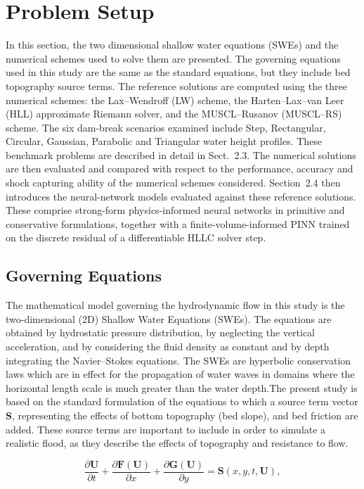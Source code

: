 \documentclass[12pt]{article}
\newcommand{\new}[1]{{\color{red}#1}}
\begin{document}
\section{Problem Setup}

In this section, the two dimensional shallow water equations (SWEs) and the numerical schemes used to solve them are presented. The governing equations used in this study are the same as the standard equations, but they include bed topography source terms. The reference solutions are computed using the three numerical schemes: the Lax–Wendroff (LW) scheme, the Harten–Lax–van Leer (HLL) approximate Riemann solver, and the MUSCL--Rusanov (MUSCL--RS) scheme. The six dam-break scenarios examined include Step, Rectangular, Circular, Gaussian, Parabolic and Triangular water height profiles. These benchmark problems are described in detail in Sect.~2.3. The numerical solutions are then evaluated and compared with respect to the performance, accuracy and shock capturing ability of the numerical schemes considered. \new{Section~2.4 then introduces the neural-network models evaluated against these reference solutions. These comprise strong-form physics-informed neural networks in primitive and conservative formulations, together with a finite-volume-informed PINN trained on the discrete residual of a differentiable HLLC solver step.}

\subsection{Governing Equations}
The mathematical model governing the hydrodynamic flow in this study is the two-dimensional (2D) Shallow Water Equations (SWEs). The equations are obtained by hydrostatic pressure distribution, by neglecting the vertical acceleration, and by considering the fluid density as constant and by depth integrating the Navier--Stokes equations. The SWEs are hyperbolic conservation laws which are in effect for the propagation of water waves in domains where the horizontal length scale is much greater than the water depth.The present study is based on the standard formulation of the equations to which a source term vector $\mathbf{S}$, representing the effects of bottom topography (bed slope), and bed friction are added. These source terms are important to include in order to simulate a realistic flood, as they describe the effects of topography and resistance to flow.

\begin{equation}
\frac{\partial \mathbf{U}}{\partial t}
+\frac{\partial \mathbf{F}(\mathbf{U})}{\partial x}
+\frac{\partial \mathbf{G}(\mathbf{U})}{\partial y}
=\mathbf{S}(x,y,t,\mathbf{U}),
\label{eq:swe}
\end{equation}
\end{document}
